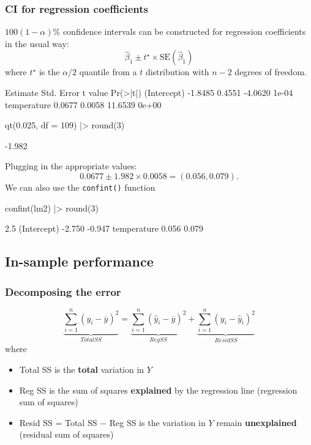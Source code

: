 \documentclass[a4paper]{article}
\begin{document}
\subsubsection{CI for regression coefficients}
\( 100(1-\alpha)\% \) confidence intervals can be constructed for regression coefficients in the usual way:
\[
	\hat{\beta}_1 \pm t^\star \times \text{SE}(\hat{\beta}_1)
\]
where \( t^\star \) is the \( \alpha / 2 \) quantile from a \( t \) distribution with \( n-2 \) degrees of freedom.
\begin{Schunk}
\begin{Soutput}
            Estimate Std. Error t value Pr(>|t|)
(Intercept)  -1.8485     0.4551 -4.0620    1e-04
temperature   0.0677     0.0058 11.6539    0e+00
\end{Soutput}
\begin{Sinput}
qt(0.025, df = 109) |> round(3)
\end{Sinput}
\begin{Soutput}
[1] -1.982
\end{Soutput}
\end{Schunk}
Plugging in the appropriate values:
\[
	0.0677 \pm 1.982 \times 0.0058 = (0.056, 0.079).
\]
We can also use the \lstinline|confint()| function
\begin{Schunk}
\begin{Sinput}
confint(lm2) |> round(3)
\end{Sinput}
\begin{Soutput}
             2.5 %
(Intercept) -2.750 -0.947
temperature  0.056  0.079
\end{Soutput}
\end{Schunk}
\subsection{In-sample performance}
\subsubsection{Decomposing the error}
\[
	\underbrace{\sum_{i=1}^n(y_i-\overline y)^2}_{{Total SS}} = \underbrace{\sum_{i=1}^n(\hat y_i-\overline y)^2}_{{Reg SS}} + \underbrace{\sum_{i=1}^n (y_i-\hat y_i)^2}_{{Resid SS}}
\]
where
\begin{itemize}
	\item Total SS is the \textbf{total} variation in \( Y \) 
	\item Reg SS is the sum of squares \textbf{explained} by the regression line (regression sum of squares)
	\item Resid SS = Total SS \( - \) Reg SS is the variation in \( Y \) remain \textbf{unexplained} (residual sum of squares)
\end{itemize}
\end{document}
